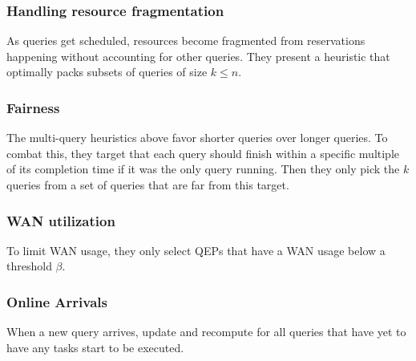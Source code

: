 
\subsubsection{Handling resource fragmentation}

As queries get scheduled, resources become fragmented from reservations happening without accounting for other queries.
They present a heuristic that optimally packs subsets of queries of size $k\leq n$.

\subsubsection{Fairness}

The multi-query heuristics above favor shorter queries over longer queries.
To combat this, they target that each query should finish within a specific multiple of its completion time if it was the only query running.
Then they only pick the $k$ queries from a set of queries that are far from this target.

\subsubsection{WAN utilization}

To limit WAN usage, they only select QEPs that have a WAN usage below a threshold $\beta$.

\subsubsection{Online Arrivals}

When a new query arrives, update and recompute for all queries that have yet to have any tasks start to be executed.

